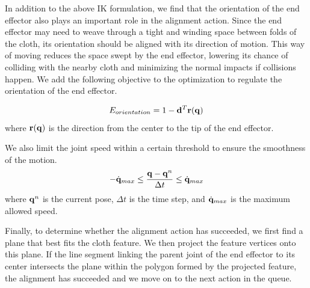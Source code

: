 In addition to the above IK formulation, we find that the orientation of the end effector also plays an important role in the alignment action. Since the end effector may need to weave through a tight and winding space between folds of the cloth, its orientation should be aligned with its direction of motion. This way of moving reduces the space swept by the end effector, lowering its chance of colliding with the nearby cloth and minimizing the normal impacts if collisions happen. We add the following objective to the optimization to regulate the orientation of the end effector.

\begin{equation}
  E_{orientation} = 1-\mathbf{d}^T\mathbf{r(q})
  \label{eq:orientation}
\end{equation}
where $\mathbf{r(q)}$ is the direction from the center to the tip of the end effector.

We also limit the joint speed within a certain threshold to ensure the smoothness of the motion.
\begin{equation}
  -\dot{\mathbf{q}}_{max} \leq \frac{\mathbf{q} - \mathbf{q}^n}{\Delta t} \leq \dot{\mathbf{q}}_{max}
  \label{eq:speed}
\end{equation}
where $\mathbf{q}^n$ is the current pose, $\Delta t$ is the time step, and $\dot{\mathbf{q}}_{max}$ is the maximum allowed speed.

Finally, to determine whether the alignment action has succeeded, we first find a plane that best fits the cloth feature. We then project the feature vertices onto this plane. If the line segment linking the parent joint of the end effector to its center intersects the plane within the polygon formed by the projected feature, the alignment has succeeded and we move on to the next action in the queue.


